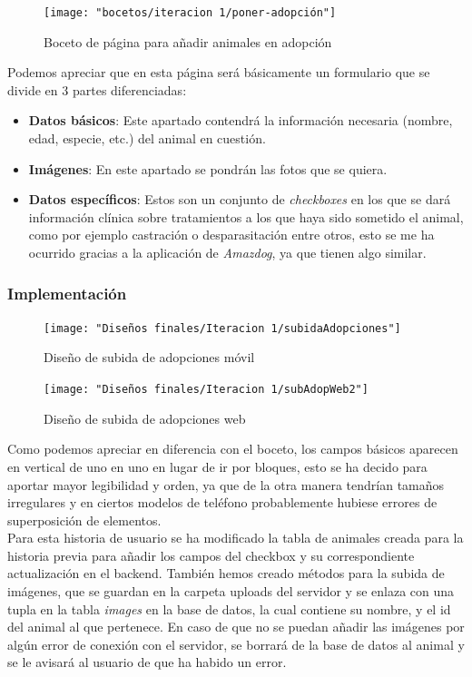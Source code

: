 \begin{figure}[H]
	\centering
	\texttt{[image: "bocetos/iteracion 1/poner-adopción"]}
	\caption{Boceto de página para añadir animales en adopción}
	\label{fig:poner-adopcion}
\end{figure}

Podemos apreciar que en esta página será básicamente un formulario que se divide en 3 partes diferenciadas: \\ 

\begin{itemize}
	\item \textbf{Datos básicos}: Este apartado contendrá la información necesaria (nombre, edad, especie, etc.) del animal en cuestión.
	\item \textbf{Imágenes}: En este apartado se pondrán las fotos que se quiera.
	\item \textbf{Datos específicos}: Estos son un conjunto de \textit{checkboxes} en los que se dará información  clínica sobre tratamientos a los que haya sido sometido el animal, como por ejemplo castración o desparasitación entre otros, esto se me ha ocurrido gracias a la aplicación de \textit{Amazdog}, ya que tienen algo similar.
\end{itemize}

\subsubsection{Implementación}

\begin{figure}[H]
	\centering
	\texttt{[image: "Diseños finales/Iteracion 1/subidaAdopciones"]}
	\caption{ Diseño de subida de adopciones móvil}
	\label{fig:subidaadopciones}
\end{figure}


\begin{figure}[H]
	\centering
	\texttt{[image: "Diseños finales/Iteracion 1/subAdopWeb2"]}
	\caption{Diseño de subida de adopciones web}
	\label{fig:subadopweb}
\end{figure}

Como podemos apreciar en diferencia con el boceto, los campos básicos aparecen en vertical de uno en uno en lugar de ir por bloques, esto se ha decido para aportar mayor legibilidad y orden, ya que de la otra manera tendrían tamaños irregulares y en ciertos modelos de teléfono probablemente hubiese errores de superposición de elementos. \\

Para esta historia de usuario se ha modificado la tabla de animales creada para la historia previa para añadir los campos del checkbox y su correspondiente actualización en el backend. También hemos creado métodos para la subida de imágenes, que se guardan en la carpeta uploads del servidor y se enlaza con una tupla en la tabla \textit{images} en la base de datos, la cual contiene su nombre, y el id del animal al que pertenece. En caso de que no se puedan añadir las imágenes por algún error de conexión con el servidor, se borrará de la base de datos al animal y se le avisará al usuario de que ha habido un error. \\


